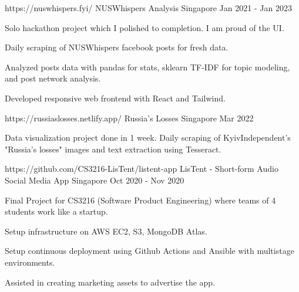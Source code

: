 

\begin{cventries}

  \cventry
    {https://nuswhispers.fyi/} %
    {NUSWhispers Analysis} %
    {Singapore} %
    {Jan 2021 - Jan 2023} %
    {
      \begin{cvitems} %
        \item {Solo hackathon project which I polished to completion. I am proud of the UI.}
        \item {Daily scraping of NUSWhispers facebook posts for fresh data.}
        \item {Analyzed posts data with pandas for stats, sklearn TF-IDF for topic modeling, and post network analysis.}
        \item {Developed responsive web frontend with React and Tailwind.}
      \end{cvitems}
    }

  \cventry
    {https://russiaslosses.netlify.app/} %
    {Russia's Losses} %
    {Singapore} %
    {Mar 2022} %
    {
      \begin{cvitems} %
        \item {Data visualization project done in 1 week. Daily scraping of KyivIndependent's "Russia's losses" images and text extraction using Tesseract.}
      \end{cvitems}
    }

  \cventry
    {https://github.com/CS3216-LisTent/listent-app} %
    {LisTent - Short-form Audio Social Media App} %
    {Singapore} %
    {Oct 2020 - Nov 2020} %
    {
      \begin{cvitems} %
        \item {Final Project for CS3216 (Software Product Engineering) where teams of 4 students work like a startup.}
        \item {Setup infrastructure on AWS EC2, S3, MongoDB Atlas.}
        \item {Setup continuous deployment using Github Actions and Ansible with multistage environments.}
        \item {Assisted in creating marketing assets to advertise the app.}
      \end{cvitems}
    }


\end{cventries}
